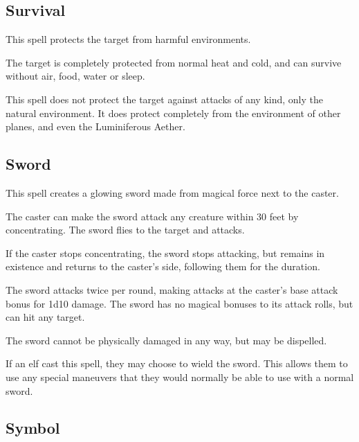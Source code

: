 \begin{multicols*}{2}
\subsection{Survival}\label{spell:Survival}

This spell protects the target from harmful environments.

The target is completely protected from normal heat and cold, and can survive without air, food, water or sleep.

This spell does not protect the target against attacks of any kind, only the natural environment. It does protect completely from the environment of other planes, and even the Luminiferous Aether.

\subsection{Sword}\label{spell:Sword}

This spell creates a glowing sword made from magical force next to the caster.

The caster can make the sword attack any creature within 30 feet by concentrating. The sword flies to the target and attacks.

If the caster stops concentrating, the sword stops attacking, but remains in existence and returns to the caster’s side, following them for the duration.

The sword attacks twice per round, making attacks at the caster’s base attack bonus for 1d10 damage. The sword has no magical bonuses to its attack rolls, but can hit any target.

The sword cannot be physically damaged in any way, but may be dispelled.

If an elf cast this spell, they may choose to wield the sword. This allows them to use any special maneuvers that they would normally be able to use with a normal sword.

\subsection{Symbol}\label{spell:Symbol}
\end{multicols*}
